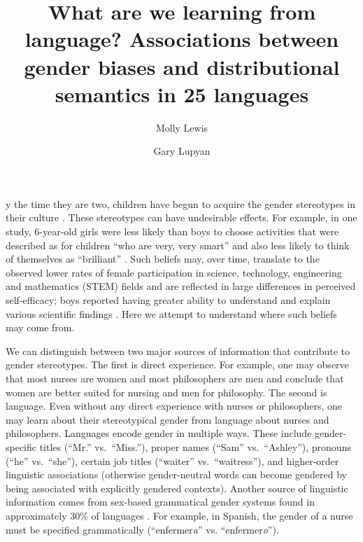 \documentclass[9pt,twocolumn,twoside,lineno]{pnas-new}
\title{What are we learning from language? Associations between gender biases
and distributional semantics in 25 languages}
\author[a,b,1]{Molly Lewis}
\author[b,1,2]{Gary Lupyan}
\affil[a]{University of Chicago}
\affil[b]{University of Wisconsin-Madison}
\begin{document}
\maketitle
\thispagestyle{firststyle}

y the time they are two, children  have begun to acquire the
gender stereotypes in their culture \cite{gelman2004mother}. These
stereotypes can have undesirable effects. For example, in one study,
6-year-old girls were less likely than boys to choose activities that
were described as for children \enquote{who are very, very smart} and
also less likely to think of themselves as \enquote{brilliant}  \cite{bian2017gender}. Such beliefs may, over time, translate to the observed lower rates of female participation in science, technology, engineering and mathematics (STEM) fields \cite{ceci2011understanding,leslie2015expectations,miller2015women,stoet2018gender} and are reflected in large differences in perceived self-efficacy; boys reported having greater ability to understand and explain various scientific findings  \citep[independent of actual ability,][]{stoet2018gender}.  Here we attempt to understand where such beliefs may come from.

We can distinguish between two major sources of information that contribute to gender stereotypes. The first is direct experience. For
example, one may observe that most nurses are women and most
philosophers are men and conclude that women are better suited for
nursing and men for philosophy. The second is language. Even without any
direct experience with nurses or philosophers, one may learn about their
stereotypical gender from language about nurses and philosophers.
Languages encode gender in multiple ways. These include gender-specific
titles (\enquote{Mr.} vs.\ \enquote{Miss.}), proper names (\enquote{Sam}
vs.\ \enquote{Ashley}), pronouns (\enquote{he} vs.\ \enquote{she}),
certain job titles (\enquote{waiter} vs.\ \enquote{waitress}), and
higher-order linguistic associations (otherwise gender-neutral words can
become gendered by being associated with explicitly gendered contexts).
Another source of linguistic information comes from sex-based
grammatical gender systems found in approximately 30\% of languages \cite{wals}. For example, in Spanish, the gender of a
nurse must be specified grammatically (\enquote{enfermer\emph{a}} vs.
\enquote{enfermer\emph{o}}).
\end{document}
